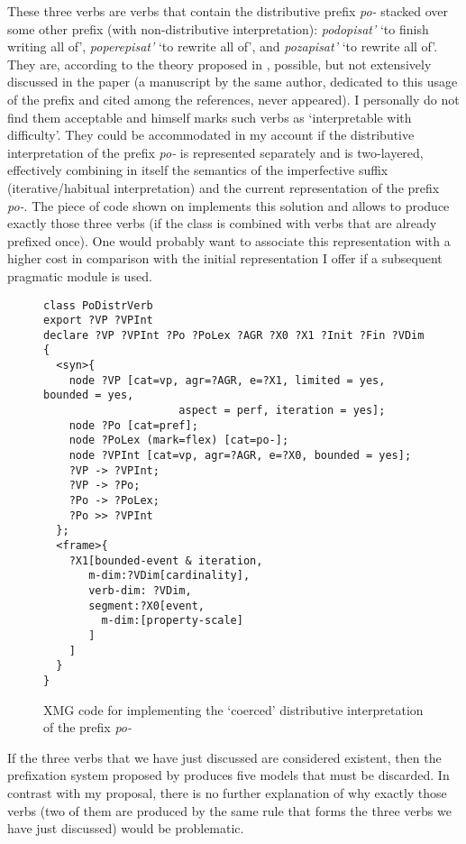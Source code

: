These three verbs are verbs that contain the distributive prefix \textit{po-} stacked over some other prefix (with non-distributive interpretation): \textit{podopisat'} `to finish writing all of', \textit{poperepisat'} `to rewrite all of', and  \textit{pozapisat'} `to rewrite all of'. They are, according to the theory proposed in \citet{Tatevosov:09}, possible, but not extensively discussed in the paper (a manuscript by the same author, dedicated to this usage of the prefix and cited among the references, never appeared). I personally do not find them acceptable and \citet[143]{Tatevosov:09} himself marks such verbs as `interpretable with difficulty'. They could be accommodated in my account if the distributive interpretation of the prefix \textit{po-} is represented separately and is two-layered, effectively combining in itself the semantics of the imperfective suffix (iterative/habitual interpretation) and the current representation of the prefix \textit{po-}. The piece of code shown on  implements this solution and allows to produce exactly those three verbs (if the class is combined with verbs that are already prefixed once). One would probably want to associate this representation with a higher cost in comparison with the initial representation I offer if a subsequent pragmatic module is used.

\begin{figure}
\begin{verbatim}
class PoDistrVerb
export ?VP ?VPInt
declare ?VP ?VPInt ?Po ?PoLex ?AGR ?X0 ?X1 ?Init ?Fin ?VDim
{
  <syn>{
    node ?VP [cat=vp, agr=?AGR, e=?X1, limited = yes, bounded = yes, 
    				 aspect = perf, iteration = yes];
    node ?Po [cat=pref];
    node ?PoLex (mark=flex) [cat=po-];
    node ?VPInt [cat=vp, agr=?AGR, e=?X0, bounded = yes];
    ?VP -> ?VPInt;
    ?VP -> ?Po;
    ?Po -> ?PoLex;
    ?Po >> ?VPInt
  };
  <frame>{
    ?X1[bounded-event & iteration,
       m-dim:?VDim[cardinality],
       verb-dim: ?VDim,
       segment:?X0[event,
         m-dim:[property-scale]
       ]
    ]
  }
}
\end{verbatim}
\caption{XMG code for implementing the `coerced' distributive interpretation of the prefix \textit{po-}\label{xmg:podistr}}
\end{figure}

If the three verbs that we have just discussed are considered existent, then the prefixation system proposed by \citet{Tatevosov:09} produces five models that must be discarded. In contrast with my proposal, there is no further explanation of why exactly those verbs (two of them are produced by the same rule that forms the three verbs we have just discussed) would be problematic.

